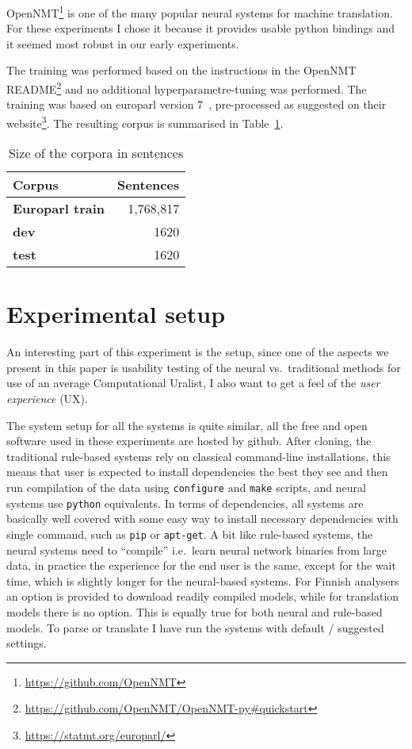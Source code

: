 \documentclass{flammie}
\begin{document}
OpenNMT\footnote{\url{https://github.com/OpenNMT}} is one of the many popular
neural systems for machine translation. For these experiments I chose it because
it provides usable python bindings and it seemed most robust in our early
experiments.

The training was performed based on the instructions in the OpenNMT
README\footnote{\url{https://github.com/OpenNMT/OpenNMT-py\#quickstart}} and no
additional hyperparametre-tuning was performed. The training was based on
europarl version 7~\citep{koehn2005europarl}, pre-processed as suggested on
their website\footnote{\url{https://statmt.org/europarl/}}. The resulting
corpus is summarised in Table~\ref{table:corpora}.

\begin{table}
\begin{center}
    \begin{tabular}{lr}
        \toprule
        Corpus & \bf Sentences \\
        \midrule
        \bf Europarl train & 1,768,817 \\
        \bf dev & 1620 \\
        \bf test & 1620 \\
        \bottomrule
    \end{tabular}
    \caption{Size of the corpora in sentences
\label{table:corpora}}
\end{center}
\end{table}

\section{Experimental setup}
\label{sec:setup}

An interesting part of this experiment is the setup, since one of the aspects we
present in this paper is usability testing of the neural vs.\ traditional methods
for use of an average Computational Uralist, I also want to get a feel of the
\textit{user experience} (UX).

The system setup for all the systems is quite similar, all the free and open
software used in these experiments are hosted by github. After cloning, the
traditional rule-based systems rely on classical command-line installations,
this means that user is expected to install dependencies the best they see and
then run compilation of the data using \texttt{configure} and \texttt{make}
scripts, and neural systems use \texttt{python} equivalents. In terms of
dependencies, all systems are basically well covered with some easy way to
install necessary dependencies with single command, such as \texttt{pip} or
\texttt{apt-get}. A bit like rule-based systems, the neural systems need to
``compile'' i.e.\ learn neural network binaries from large data, in practice the
experience for the end user is the same, except for the wait time, which is
slightly longer for the neural-based systems.  For Finnish analysers an option
is provided to download readily compiled models, while for translation models
there is no option.  This is equally true for both neural and rule-based models.
To parse or translate I have run the systems with default / suggested settings.
\end{document}
